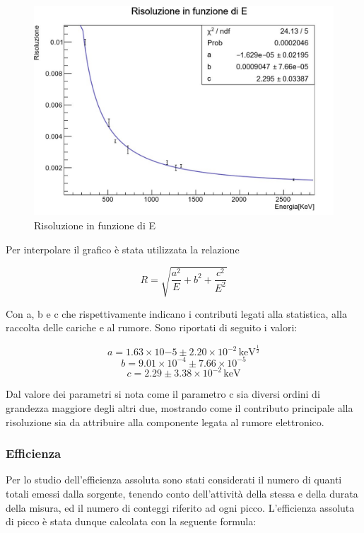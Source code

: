 \documentclass[a4paper,10pt]{article}
\newcommand*{\unit}[1]{\ensuremath{\mathrm{\,#1}}}
\begin{document}
\begin{figure}[H]
    \centering
    \includegraphics[scale=0.6]{grafici/risoluzionesources}
    \caption{Risoluzione in funzione di E}
\end{figure}

\noindent Per interpolare il grafico \`e stata utilizzata la relazione

\begin{equation}
	R=\sqrt{\frac{a^2}{E}+b^2+\frac{c^2}{E^2}}
\end{equation}

\noindent Con a, b e c che rispettivamente indicano i contributi legati alla statistica, alla raccolta delle cariche e al rumore. Sono riportati di seguito i valori:

$$
	a=1.63 \times 10{-5} \pm 2.20 \times 10^{-2} \unit{keV^{\frac{1}{2}}}
$$
$$
	b=9.01 \times 10^{-4} \pm 7.66 \times 10^{-5}
$$
$$
	c= 2.29 \pm 3.38 \times 10^{-2} \unit{keV}
$$

\noindent Dal valore dei parametri si nota come il parametro c sia diversi ordini di grandezza maggiore degli altri due, mostrando come il contributo principale alla risoluzione sia da attribuire alla componente legata al rumore elettronico.


\subsubsection{Efficienza}
Per lo studio dell'efficienza assoluta sono stati considerati il numero di quanti totali emessi dalla sorgente, tenendo conto dell'attivit\`a della stessa e della durata della misura, ed il numero di conteggi riferito ad ogni picco. L'efficienza assoluta di picco \`e stata dunque calcolata con la seguente formula:
\end{document}
